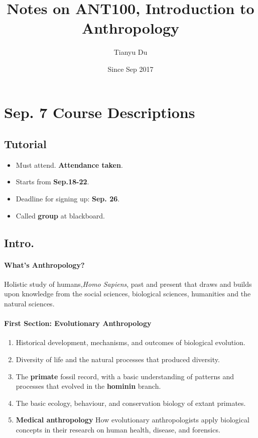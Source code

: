 \documentclass{article}
\author{Tianyu Du}
\date{Since Sep 2017}
\title{Notes on ANT100, Introduction to Anthropology}
\begin{document}
	\maketitle
	\tableofcontents
	\section{Sep. 7 Course Descriptions}
	\subsection{Tutorial}
	\begin{itemize}
		\item Must attend. \textbf{Attendance taken}.
		\item Starts from \textbf{Sep.18-22}.
		\item Deadline for signing up: \textbf{Sep. 26}.
		\item Called \textbf{group} at blackboard.
	\end{itemize}
	\subsection{Intro.}
	\paragraph{What's Anthropology?} Holistic study of humans,\emph{Homo Sapiens}, past and present that draws and builds upon knowledge from the social sciences, biological sciences, humanities and the natural sciences.
	\paragraph{First Section: Evolutionary Anthropology}
	\begin{enumerate}
		\item Historical development, mechanisms, and outcomes of biological evolution.
		\item Diversity of life and the natural processes that produced diversity.
		\item The \textbf{primate} fossil record, with a basic understanding of patterns and processes that evolved in the \textbf{hominin} branch.
		\item The basic ecology, behaviour, and conservation biology of extant primates.
		\item \textbf{Medical anthropology} How evolutionary anthropologists apply biological concepts in their research on human health, disease, and forensics.
	\end{enumerate}
\end{document}
